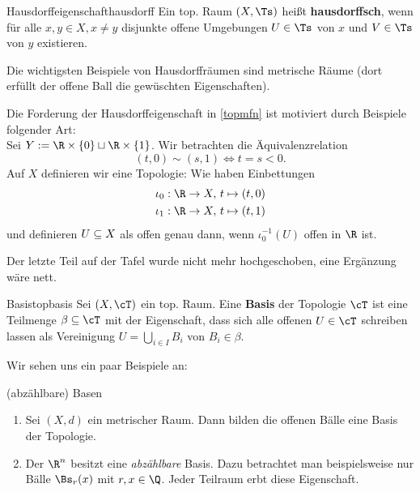 \begin{definition}{Hausdorffeigenschaft}{hausdorff}
Ein top. Raum $(X, \Ts)$ heißt \textbf{hausdorffsch}, wenn für alle $x,y \in X, x \neq y$ disjunkte offene Umgebungen $U \in \Ts$ von $x$ und $V \in \Ts$ von $y$ existieren.
\end{definition}
Die wichtigsten Beispiele von Hausdorffräumen sind metrische Räume (dort erfüllt der offene Ball die gewüschten Eigenschaften).
\begin{bemerkung}
Die Forderung der Hausdorffeigenschaft in \ref{topmfn} ist motiviert durch Beispiele folgender Art:\\
Sei $Y := \R \times \{0\} \sqcup \R \times \{1\}$. Wir betrachten die Äquivalenzrelation
\begin{equation}
(t, 0) \sim (s, 1) \iff t=s < 0.
\end{equation} 
Auf $X$ definieren wir eine Topologie: Wie haben Einbettungen
\begin{align}
\iota_0: \R \to X, \ &t \mapsto (t, 0) \\
\iota_1: \R \to X, \ &t \mapsto (t, 1)
\end{align}
und definieren $U \subseteq X$ als offen genau dann, wenn $\iota_0^{-1} (U)$ offen in $\R$ ist.
\end{bemerkung}
\begin{warning}
Der letzte Teil auf der Tafel wurde nicht mehr hochgeschoben, eine Ergänzung wäre nett.
\end{warning}
\begin{definition}{Basis}{topbasis}
Sei $(X, \cT)$ ein top. Raum. Eine \textbf{Basis} der Topologie $\cT$ ist eine Teilmenge $\beta \sub \cT$ mit der Eigenschaft, dass sich alle offenen $U \in \cT$ schreiben lassen als Vereinigung $U = \bigcup_{i \in I} B_i$ von $B_i \in \beta$.
\end{definition}
Wir sehen uns ein paar Beispiele an:
\begin{beispiele}{(abzählbare) Basen}
\begin{enumerate}
\item Sei $(X, d)$ ein metrischer Raum. Dann bilden die offenen Bälle eine Basis der Topologie.
\item Der $\R^n$ besitzt eine \textit{abzählbare} Basis. Dazu betrachtet man beispielsweise nur Bälle $\Bs_r(x)$ mit $r, x \in \Q$. Jeder Teilraum erbt diese Eigenschaft.
\end{enumerate}
\end{beispiele}
